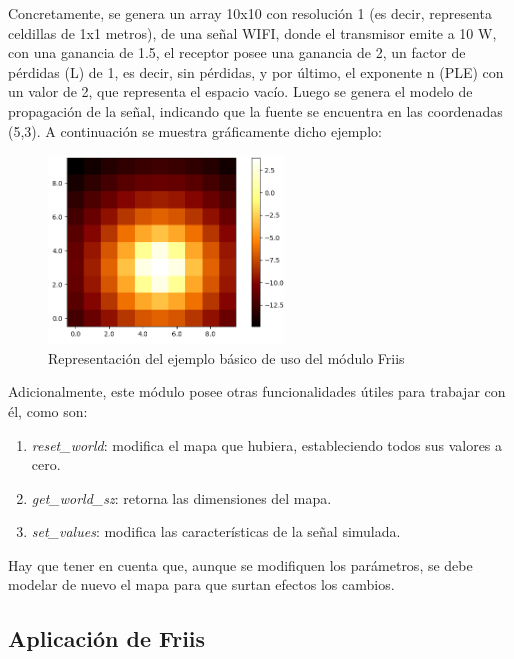 Concretamente, se genera un array 10x10 con resolución 1 (es decir, representa celdillas de 1x1 metros), de una señal WIFI, donde el transmisor emite a 10 W, con una ganancia de 1.5, el receptor posee una ganancia de 2, un factor de pérdidas (L) de 1, es decir, sin pérdidas, y por último, el exponente n (\ac{PLE}) con un valor de 2, que representa el espacio vacío. Luego se genera el modelo de propagación de la señal, indicando que la fuente se encuentra en las coordenadas (5,3). A continuación se muestra gráficamente dicho ejemplo:\\

\begin{figure} [H]
	\begin{center}
	\includegraphics[height=5cm]{imagenes/cap4/4_heatmap_example.png}
	\end{center}
	\caption[Representación del ejemplo básico de uso del módulo Friis]{Representación del ejemplo básico de uso del módulo Friis}
	\label{fig:heat_ex}
\end{figure}

Adicionalmente, este módulo posee otras funcionalidades útiles para trabajar con él, como son:

\begin{enumerate}
    \item \emph{reset\_world}: modifica el mapa que hubiera, estableciendo todos sus valores a cero.

    \item \emph{get\_world\_sz}: retorna las dimensiones del mapa.

    \item \emph{set\_values}: modifica las características de la señal simulada.
\end{enumerate}

Hay que tener en cuenta que, aunque se modifiquen los parámetros, se debe modelar de nuevo el mapa para que surtan efectos los cambios.\\

\subsection{Aplicación de Friis}
\label{subsec:friis-app}


